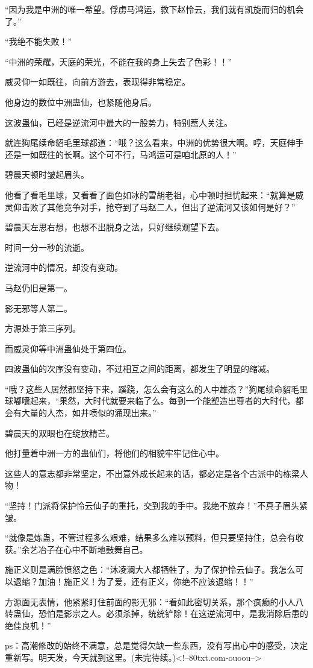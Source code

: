 \begin{this_body}
“因为我是中洲的唯一希望。俘虏马鸿运，救下赵怜云，我们就有凯旋而归的机会了。”

“我绝不能失败！”

“中洲的荣耀，天庭的荣光，不能在我的身上失去了色彩！！”

威灵仰一如既往，向前方游去，表现得非常稳定。

他身边的数位中洲蛊仙，也紧随他身后。

这波蛊仙，已经是逆流河中最大的一股势力，特别惹人关注。

就连狗尾续命貂毛里球都道：“哦？这么看来，中洲的优势很大啊。哼，天庭伸手还是一如既往的长啊。这个可不行，马鸿运可是咱北原的人！”

碧晨天顿时皱起眉头。

他看了看毛里球，又看看了面色如冰的雪胡老祖，心中顿时担忧起来：“就算是威灵仰击败了其他竞争对手，抢夺到了马赵二人，但出了逆流河又该如何是好？”

碧晨天左思右想，也想不出脱身之法，只好继续观望下去。

时间一分一秒的流逝。

逆流河中的情况，却没有变动。

马赵仍旧是第一。

影无邪等人第二。

方源处于第三序列。

而威灵仰等中洲蛊仙处于第四位。

四波蛊仙的次序没有变动，不过相互之间的距离，都发生了明显的缩减。

“哦？这些人居然都坚持下来，蹊跷，怎么会有这么的人中雄杰？”狗尾续命貂毛里球嘟囔起来，“果然，大时代就要来临了么。每到一个能塑造出尊者的大时代，都会有大量的人杰，如井喷似的涌现出来。”

碧晨天的双眼也在绽放精芒。

他打量着中洲一方的蛊仙们，将他们的相貌牢牢记住心中。

这些人的意志都非常坚定，不出意外成长起来的话，都必定是各个古派中的栋梁人物！

“坚持！门派将保护怜云仙子的重托，交到我的手中。我绝不放弃！”不真子眉头紧皱。

“就像是炼蛊，不管过程多么艰难，结果多么难以预料，但只要坚持住，总会有收获。”余艺冶子在心中不断地鼓舞自己。

施正义则是满脸愤怒之色：“沐凌澜大人都牺牲了，为了保护怜云仙子。我怎么可以退缩？加油！施正义！为了爱，还有正义，你绝不应该退缩！！”

方源面无表情，他紧紧盯住前面的影无邪：“看如此密切关系，那个疯癫的小人八转蛊仙，恐怕是影宗之人。必须杀掉，统统铲除！在这逆流河中，是我消除后患的绝佳良机！”

ps：高潮修改的始终不满意，总是觉得欠缺一些东西，没有写出心中的感受，决定重新写。明天发，今天就到这里。(未完待续。)<!--80txt.com-ouoou-->

\end{this_body}

